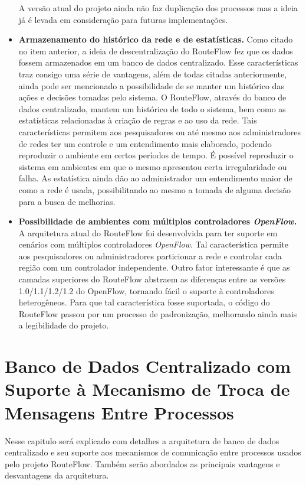 \begin{itemize}
A versão atual do projeto ainda
não faz duplicação dos processos mas a ideia já é levada em
consideração para futuras implementações. 
\item \textbf{Armazenamento do histórico da rede e de estatísticas.}
Como citado no item anterior, a ideia de descentralização do RouteFlow
fez que os dados fossem armazenados em um banco de 
dados centralizado. Esse características traz consigo
uma série de vantagens, além de todas citadas anteriormente, ainda pode ser 
mencionado a possibilidade
de se manter um histórico das ações e decisões tomadas pelo
sistema. O RouteFlow, através do banco de dados centralizado, mantem 
um histórico de todo o sistema, bem como as estatísticas relacionadas 
à criação de regras e ao uso da rede. Tais características permitem
 aos pesquisadores
ou até mesmo aos administradores de redes ter um controle 
e um entendimento mais elaborado, podendo reproduzir o ambiente
em certos períodos de tempo. É possível reproduzir o sistema
em ambientes em que o mesmo apresentou certa irregularidade ou
falha. 
As estatística ainda dão ao administrador um entendimento maior 
de como a rede é usada, possibilitando ao mesmo a tomada de
alguma decisão para a busca de melhorias.
\item \textbf{Possibilidade de ambientes com múltiplos controladores
\textit{OpenFlow}.} A arquitetura atual do RouteFlow foi
desenvolvida para ter suporte em cenários com múltiplos controladores
\textit{OpenFlow}. Tal característica permite aos pesquisadores
ou administradores particionar a rede e controlar cada região
com um controlador independente. Outro fator interessante é
que as camadas superiores do RouteFlow abstraem as diferenças
entre as versões 1.0/1.1/1.2/1.2 do OpenFlow, tornando fácil o
suporte à controladores heterogêneos. 
Para que tal característica fosse suportada, o código do RouteFlow
passou por um processo de padronização, melhorando ainda 
mais a legibilidade do projeto.
\end{itemize}

\section{Banco de Dados Centralizado com Suporte à Mecanismo
de Troca de Mensagens Entre Processos}

Nesse capitulo será explicado com detalhes a arquitetura de 
banco de dados centralizado e seu suporte aos mecanismos
de comunicação entre processos usados pelo projeto RouteFlow.
Também serão abordados as principais vantagens e desvantagens
da arquitetura.


